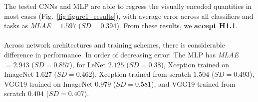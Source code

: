  The tested CNNs and MLP are able to regress the visually encoded quantities in most cases (Fig.~\ref{fig:figure1_results}), with average error across all classifiers and tasks as \textit{MLAE}$=1.597$ ($SD=0.394$). %
From these results, we \textbf{accept H1.1}.
\\~\\
Across network architectures and training schemes, there is considerable difference in performance. In order of decreasing error: 
The MLP has \textit{MLAE}$=2.943$ ($SD=0.857$), 
for LeNet $2.125$ ($SD=0.38$), 
Xception trained on ImageNet $1.627$ ($SD=0.462$), 
Xception trained from scratch $1.504$ ($SD=0.493$),
VGG19 trained on ImageNet $0.979$ ($SD=0.581$), 
and VGG19 trained from scratch $0.404$ ($SD=0.407$).

